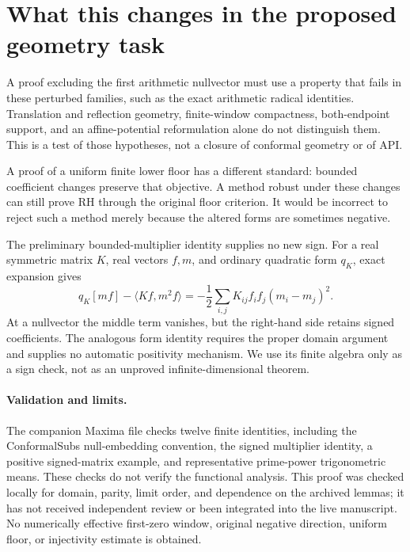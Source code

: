 \documentclass[11pt]{article}
\begin{document}
\section{What this changes in the proposed geometry task}
A proof excluding the first arithmetic nullvector must use a property
that fails in these perturbed families, such as the exact arithmetic
radical identities. Translation and reflection geometry, finite-window
compactness, both-endpoint support, and an affine-potential reformulation
alone do not distinguish them. This is a test of those hypotheses,
not a closure of conformal geometry or of API.

A proof of a uniform finite lower floor has a different standard:
bounded coefficient changes preserve that objective. A method robust
under these changes can still prove RH through the original floor
criterion. It would be incorrect to reject such a method merely
because the altered forms are sometimes negative.

The preliminary bounded-multiplier identity supplies no new sign.
For a real symmetric matrix $K$, real vectors $f,m$, and ordinary
quadratic form $q_K$, exact expansion gives
\[
 q_K[mf]-\langle Kf,m^2f\rangle
 =-\frac12\sum_{i,j}K_{ij}f_if_j(m_i-m_j)^2.
\]
At a nullvector the middle term vanishes, but the right-hand side
retains signed coefficients. The analogous form identity requires
the proper domain argument and supplies no automatic positivity
mechanism. We use its finite algebra only as a sign check, not as
an unproved infinite-dimensional theorem.

\paragraph{Validation and limits.}
The companion Maxima file checks twelve finite identities, including
the ConformalSubs null-embedding convention, the signed multiplier
identity, a positive signed-matrix example, and representative
prime-power trigonometric means. These checks do not verify the
functional analysis. This proof was checked locally for domain,
parity, limit order, and dependence on the archived lemmas; it has
not received independent review or been integrated into the live manuscript.
No numerically effective first-zero window, original negative direction, uniform
floor, or injectivity estimate is obtained.
\end{document}
